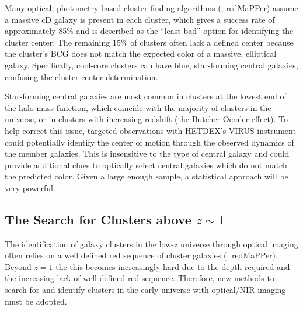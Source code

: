 Many optical, photometry-based cluster finding algorithms (\eg, redMaPPer) assume a massive cD galaxy is present in each cluster, which gives a success rate of approximately 85\% and is described as the ``least bad'' option for identifying the cluster center. The remaining 15\% of clusters often lack a defined center because the cluster's BCG does not match the expected color of a massive, elliptical galaxy. Specifically, cool-core clusters can have blue, star-forming central galaxies, confusing the cluster center determination.

Star-forming central galaxies are most common in clusters at the lowest end of the halo mass function, which coincide with the majority of clusters in the universe, or in clusters with increasing redshift (the Butcher-Oemler effect). To help correct this issue, targeted observations with HETDEX's VIRUS instrument could potentially identify the center of motion through the observed dynamics of the member galaxies. This is insensitive to the type of central galaxy and could provide additional clues to optically select central galaxies which do not match the predicted color. Given a large enough sample, a statistical approach will be very powerful.

\subsection{The Search for Clusters above $z\sim1$}
The identification of galaxy clusters in the low-$z$ universe through optical imaging often relies on a well defined red sequence of cluster galaxies (\eg, redMaPPer). Beyond $z=1$ the this becomes increasingly hard due to the depth required and the increasing lack of well defined red sequence. Therefore, new methods to search for and identify clusters in the early universe with optical/NIR imaging must be adopted.
 
